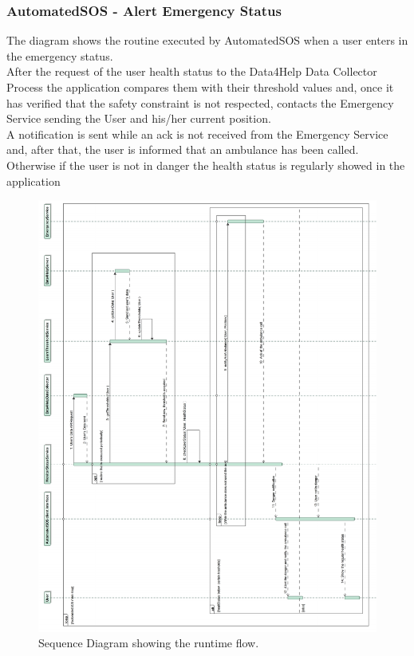 \documentclass[a4paper]{article}
\begin{document}
\subsubsection{AutomatedSOS - Alert Emergency Status}
The diagram shows the routine executed by AutomatedSOS when a user enters in the emergency status. \\
After the request of the user health status to the Data4Help Data Collector Process the application compares them with their threshold values and, once it has verified that the safety constraint is not respected, contacts the Emergency Service sending the User and his/her current position. \\
A notification is sent while an ack is not received from the Emergency Service and, after that, the user is informed that an ambulance has been called. Otherwise if the user is not in danger the health status is regularly showed in the application

\begin{figure}[H]
    \centering
    \includegraphics[width=\linewidth]{SequenceDiagram-AlertEmergencyStatus}
    \caption{Sequence Diagram showing the runtime flow.}
    \label{fig:my_label}
\end{figure}
\clearpage
\end{document}

